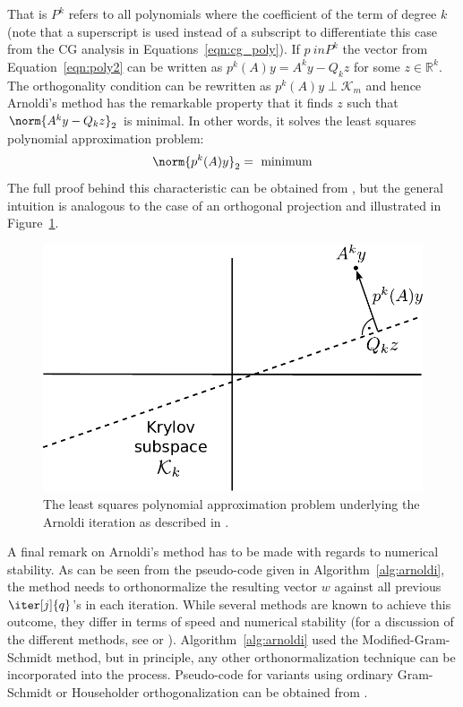 \noindent  That is $P^k$ refers to all polynomials where the coefficient of the term of degree $k$ (note that a superscript is used instead of a subscript to differentiate this case from the CG analysis in Equations~\hyperref[eqn:cg_poly]{\ref{eqn:cg_poly}}). If $p \ in P^k$ the vector from Equation~\hyperref[eqn:poly2]{\ref{eqn:poly2}} can be written as $p^k(A)y=A^ky-Q_kz$ for some $z \in \mathbb{R}^k$. The orthogonality condition can be rewritten as $p^k(A)y \perp \mathcal{K}_m$ and hence Arnoldi's method has the remarkable property that it finds $z$ such that $\norm{A^ky-Q_kz}_2$ is minimal. In other words, it solves the least squares polynomial approximation problem:
\begin{equation}
\label{eqn:poly_arnoldi}
    \norm{p^k(A)y}_2 = \text{ minimum}
\end{equation}
\noindent The full proof behind this characteristic can be obtained from \cite{trefethen_numerical_1997}, but the general intuition is analogous to the case of an orthogonal projection and illustrated in Figure~\hyperref[fig:arnoldi]{\ref{fig:arnoldi}}.

\begin{figure}[h]
    \centering
    \includegraphics[width=0.6\linewidth]{chapters/2_solvers/2_3_iterative_solvers/figures/Arnoldi.pdf}
    \caption{The least squares polynomial approximation problem underlying the Arnoldi iteration as described in \cite{trefethen_numerical_1997}.}
    \label{fig:arnoldi}
\end{figure}

\noindent A final remark on Arnoldi's method has to be made with regards to numerical stability. As can be seen from the pseudo-code given in Algorithm~\hyperref[alg:arnoldi]{\ref{alg:arnoldi}}, the method needs to orthonormalize the resulting vector $w$ against all previous $\iter[j]{q}$'s in each iteration. While several methods are known to achieve this outcome, they differ in terms of speed and numerical stability (for a discussion of the different methods, see \cite{golub_matrix_2013} or \cite{trefethen_numerical_1997}). Algorithm~\hyperref[alg:arnoldi]{\ref{alg:arnoldi}} used the Modified-Gram-Schmidt method, but in principle, any other orthonormalization technique can be incorporated into the process. Pseudo-code for variants using ordinary Gram-Schmidt or Householder orthogonalization can be obtained from \cite{saad_iterative_2003}.


